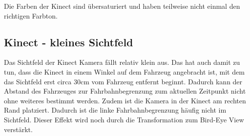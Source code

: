 Die Farben der Kinect sind übersaturiert und haben teilweise nicht einmal den richtigen Farbton.

\subsection{Kinect - kleines Sichtfeld}
\label{sec:sichtfeld}
Das Sichtfeld der Kinect Kamera fällt relativ klein aus.
Das hat auch damit zu tun, dass die Kinect in einem Winkel auf dem Fahrzeug angebracht ist, mit dem das Sichtfeld erst circa 30cm vom Fahrzeug entfernt beginnt.
Dadurch kann der Abstand des Fahrzeuges zur Fahrbahnbegrenzung zum aktuellen Zeitpunkt nicht ohne weiteres bestimmt werden. 
Zudem ist die Kamera in der Kinect am rechten Rand platziert.
Dadurch ist die linke Fahrbahnbegrenzung häufig nicht im Sichtfeld.
Dieser Effekt wird noch durch die Transformation zum Bird-Eye View verstärkt.

